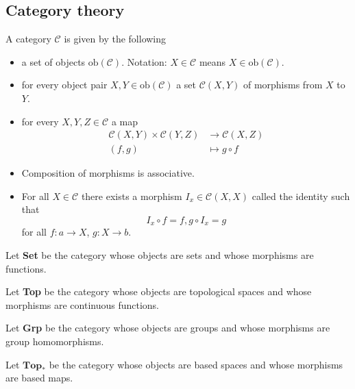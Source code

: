 \subsection{Category theory}

\begin{definition}[Category]
   A category \( \mathcal{C} \) is
   given by the following
   \begin{itemize}
      \item a set of objects \( \text{ob}(\mathcal{C}) \).
       Notation: \( X \in \mathcal{C} \) means \( X \in \text{ob}(\mathcal{C}) \).
      \item for every object pair \( X, Y \in \text{ob}(\mathcal{C}) \)
        a set \( \mathcal{C}(X, Y) \) of morphisms from \( X \) to \( Y \).
      \item for every \( X, Y, Z \in \mathcal{C} \) a map
        \begin{align*}
          \mathcal{C}(X, Y) \times \mathcal{C}(Y, Z) &\to \mathcal{C}(X, Z) \\
          (f, g) &\mapsto g \circ f
        \end{align*}
      \item Composition of morphisms is associative.
      \item For all \( X \in \mathcal{C} \) there exists a morphism
          \( I_x \in \mathcal{C}(X, X) \) called the identity such that
          \[
            I_x \circ f = f, g \circ I_x = g
          \]
          for all \( f: a \to X \), \( g: X \to b \).
   \end{itemize}
\end{definition}

\begin{example}
    Let \textbf{Set} be the category whose objects are sets
    and whose morphisms are functions.
\end{example}

\begin{example}
    Let \textbf{Top} be the category whose objects are topological spaces
    and whose morphisms are continuous functions.
\end{example}

\begin{example}
    Let \textbf{Grp} be the category whose objects are groups
    and whose morphisms are group homomorphisms.
\end{example}

\begin{example}
    Let \( \textbf{Top}_* \) be the category whose objects are based spaces
    and whose morphisms are based maps.
\end{example}

